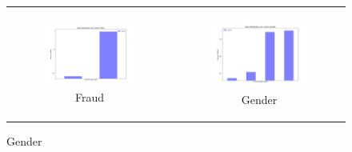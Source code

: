 \begin{figure}
{\begin{tabular}[c]{cc}
     \begin{subfigure}[c]{0.45\textwidth}
         \centering
         \includegraphics[width=\textwidth]{assets/results/syntheticFincances/distribution/fraud.png}
         \caption{Fraud}
         \label{}
     \end{subfigure} &
     
     \begin{subfigure}[c]{0.45\textwidth}
         \centering
         \includegraphics[width=\textwidth]{assets/results/syntheticFincances/distribution/gender.png}
         \caption{Gender}
         \label{}
     \end{subfigure}  \\
     

\end{tabular}}
\end{figure}
